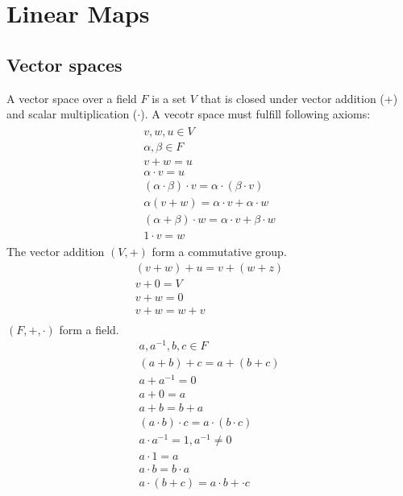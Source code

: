 \chapter{Linear Maps}
\section{Vector spaces}
A vector space over a field \(F\) is a set \(V\) that is closed under vector addition (+) and scalar multiplication (\( \cdot \)). A vecotr space must fulfill following axioms:
\begin{align}
    \begin{split}
        v, w, u \in V \\
        \alpha, \beta \in F \\
        v + w = u  \\
        \alpha \cdot v = u \\
        (\alpha \cdot \beta) \cdot v = \alpha \cdot (\beta \cdot v)      \\
        \alpha (v + w) = \alpha \cdot v + \alpha \cdot w              \\
        (\alpha + \beta) \cdot w = \alpha \cdot v + \beta \cdot w \\
        1 \cdot v = w
    \end{split}
\end{align}
The vector addition \((V,+)\) form a commutative group.
\begin{align*}
    (v + w) + u = v + (w + z) \tag*{Associativity} \\
    v + 0 = V \tag*{Identity element: zero vector} \\
    v + w = 0 \tag*{Inverse element}               \\
    v + w  = w + v \tag*{Commutativity}            \\
\end{align*}
\( (F, +, \cdot)\) form a field.
\begin{align*}
    a, a^{-1}, b, c \in F                                                         \\
    (a + b) + c = a + (b + c) \tag*{Additive associativity}                       \\
    a + a^{-1} = 0 \tag*{Additive inverse}                                        \\
    a + 0 = a \tag*{Additive identity}                                            \\
    a + b = b + a \tag*{Additive commutativity}                                   \\
    (a \cdot b) \cdot c = a \cdot (b \cdot c)  \tag*{Mulitlicative associativity} \\
    a \cdot a^{-1} = 1, a^{-1} \neq 0 \tag*{Mulitlicative inverse}                \\
    a  \cdot 1 = a \tag*{Multiplicative identity}                                 \\
    a \cdot b = b \cdot a \tag*{Mulitplicative commutativity}                     \\
    a \cdot (b + c) = a\cdot b + \cdot c \tag*{Distibutivity}
\end{align*}

